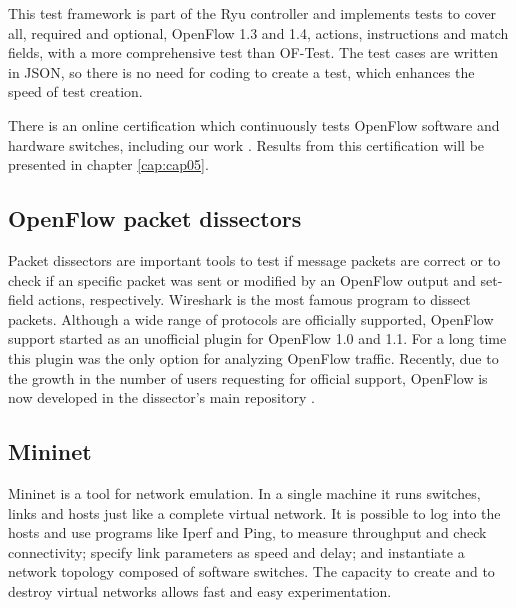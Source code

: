    This test framework is part of the Ryu controller and implements tests to cover all, required and optional, OpenFlow 1.3 and 1.4, actions, instructions and match fields, with a more comprehensive test than OF-Test. The test cases are written in JSON, so there is no need for coding to create a test, which enhances the speed of test creation. 
    
    There is an online certification which continuously tests OpenFlow software and hardware switches, including our work \cite{ryucert}. Results from this certification will be presented in chapter \ref{cap:cap05}.

    \subsection{OpenFlow packet dissectors}

    Packet dissectors are important tools to test if message packets are correct or to check if an specific packet was sent or modified by an OpenFlow output and set-field actions, respectively. Wireshark \cite{wireof} is the most famous program to dissect packets. Although a wide range of protocols are officially supported, OpenFlow support started as an  unofficial  plugin for OpenFlow 1.0 and 1.1. For a long time this plugin was the only option for analyzing OpenFlow traffic. Recently, due to the growth in the number of users requesting for official support, OpenFlow is now developed in the dissector's main repository \cite{wireof}.    
    \subsection{Mininet}
    
   Mininet \cite{Lantz:2010:NLR:1868447.1868466} is a tool for network emulation. In a single machine it runs switches, links and hosts just like a complete virtual network. It is possible to log into the hosts and use programs like Iperf \cite{iperf} and Ping, to measure throughput and check connectivity; specify link parameters as speed and delay; and instantiate a network topology composed of software switches. The capacity to create and to destroy virtual networks allows fast and easy experimentation. 
  
    